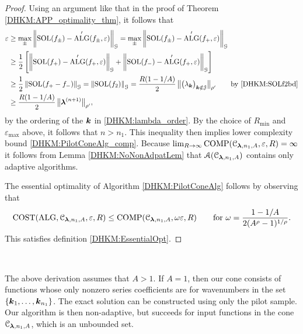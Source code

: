 \documentclass[USenglish]{article}
\theoremstyle{dgthm}
\theoremstyle{dgthm}
\theoremstyle{dgthm}
\theoremstyle{dgthm}
\theoremstyle{dgdef}
\theoremstyle{definition}
\DeclareMathOperator{\DHKMSOL}{SOL}
\DeclareMathOperator{\DHKMALG}{ALG}
\DeclareMathOperator{\DHKMCOST}{COST}
\DeclareMathOperator{\DHKMCOMP}{COMP}
\newcommand{\DHKMnorm}[2][{}]{\ensuremath{\left \lVert #2 \right \rVert}_{#1}}
\newcommand{\bignorm}[2][{}]{\ensuremath{\bigl \lVert #2 \bigr \rVert}_{#1}}
\begin{document}
\begin{proof}
Using an argument like that in the proof of  Theorem \ref{DHKM:APP_optimality_thm}, it follows that 
\begin{align*}
\varepsilon & \ge \max_{\pm} \DHKMnorm[\calG]{\DHKMSOL(f_{\pm}) - \DHKMALG'(f_{\pm},\varepsilon)} 
=  \max_{\pm} \DHKMnorm[\calG]{\DHKMSOL(f_{\pm}) - \DHKMALG'(f_{+},\varepsilon)} \\
& \ge \frac 12 \left [ \DHKMnorm[\calG]{\DHKMSOL(f_{+}) - \DHKMALG'(f_{+},\varepsilon)} 
+ \DHKMnorm[\calG]{\DHKMSOL(f_{-}) - \DHKMALG'(f_{+},\varepsilon)}  \right] \\
& \ge \frac 12 \DHKMnorm[\calG]{\DHKMSOL(f_+ - f_-)} = \DHKMnorm[\calG]{\DHKMSOL(f_2)} 
=\frac{R(1 - 1/A)}{2} \, \bignorm[\rho']{\bigl(  \lambda_{\bsk}  \bigr)_{\bsk \notin \calJ}} \qquad \text{by \eqref{DHKM:SOLf2bd}} \\
& \ge \frac{R(1 - 1/A)}{2} \, \bignorm[\rho']{\bslambda^{(n+1)}} ,
\end{align*}
by the ordering of the ${\boldsymbol{k}}$ in \eqref{DHKM:lambda_order}.  By the choice of $R_{\min}$ and $\varepsilon_{\max}$ above, it follows that $n > n_1$.  This inequality then implies lower complexity bound \eqref{DHKM:PilotConeAlg_comp}. Because $\lim_{R \to \infty} \DHKMCOMP(\calC_{\boldsymbol{\lambda},n_1,A}, \varepsilon,R) = \infty$  it follows from Lemma \ref{DHKM:NoNonAdpatLem} that ${\mathcal{A}}({\mathcal{C}}_{\boldsymbol{\lambda},n_1,A})$ contains only adaptive algorithms.

The essential optimality of Algorithm \ref{DHKM:PilotConeAlg} follows by observing that 
\[
\DHKMCOST(\DHKMALG,\calC_{\boldsymbol{\lambda},n_1,A},\varepsilon,R) \le \DHKMCOMP(\calC_{\boldsymbol{\lambda},n_1,A},\omega \varepsilon,R) \qquad \text{for } \omega = \frac{1-1/A}{2(A^\rho -1)^{1/\rho}}.
\]
This satisfies definition \eqref{DHKM:EssentialOpt}.  
\end{proof} \

The above derivation assumes that $A > 1$.  If $A =1$, then our cone consists of functions whose only nonzero series coefficients are for wavenumbers in the set $\{{\boldsymbol{k}}_1, \ldots, {\boldsymbol{k}}_{n_1}\}$.  The exact solution can be constructed using only the pilot sample.  Our algorithm is then non-adaptive, but succeeds for input functions in the cone ${\mathcal{C}}_{\boldsymbol{\lambda},n_1,A}$, which is an unbounded set.
\end{document}
